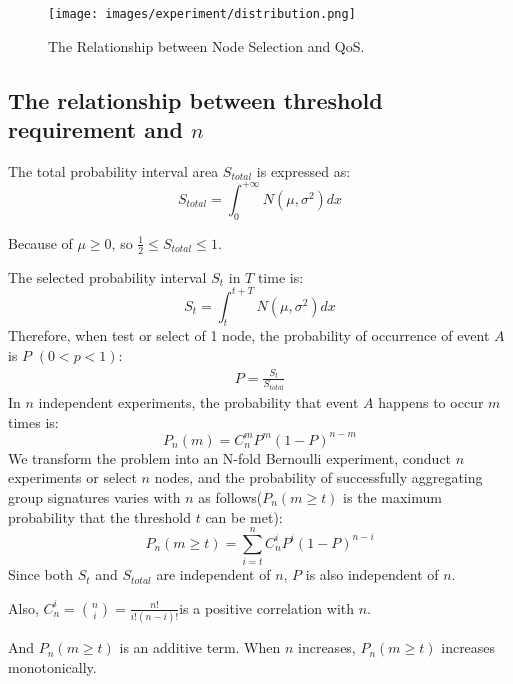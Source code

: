 \documentclass[paper]{ieice}
\begin{document}
    \begin{figure}[h!]
        \centering
        \texttt{[image: images/experiment/distribution.png]}
        \caption{The Relationship between Node Selection and QoS.}
        \label{fig:distribution}
    \end{figure}

    \subsection{The relationship between threshold requirement and $n$}
      The total probability interval area $S_{total}$ is expressed as:
          \begin{equation}
        S_{total} = \int_{0}^{+\infty}N(\mu,\sigma^2)dx
    \end{equation}
    
    Because of $\mu \ge 0$, so $\frac{1}{2} \leq S_{total} \leq 1$.
    
    The selected probability interval $S_{t}$ in $T$ time is:
    \begin{equation}
        S_{t} = \int_{t}^{t+T}N(\mu,\sigma^2)dx
    \end{equation}
    Therefore, when test or select of 1 node, the probability of occurrence of event $A$ is $P$ $(0<p<1)$:
      \begin{gather}
         P = \frac{S_{t}}{S_{total}}
    \end{gather}
    In $n$ independent experiments, the probability that event $A$ happens to occur $m$ times is:
    \begin{equation}
        P_n(m) = C_n^m P^m(1-P)^{n-m}
    \end{equation}
    We transform the problem into an N-fold Bernoulli experiment, conduct $n$ experiments or select $n$ nodes, and the probability of successfully aggregating group signatures varies with $n$ as follows($P_n(m \ge t)$ is the maximum probability that the threshold $t$ can be met):
    \begin{equation}
        P_n(m \ge t) = \sum_{i=t}^{n} C_n^i P^i(1-P)^{n-i}
    \end{equation}
    Since both $S_t$ and $S_{total}$ are independent of $n$, $P$ is also independent of $n$.
    
    Also, $C_n^i = \binom{n}{i} = \frac{n!}{i!(n-i)!} $is a positive correlation with $n$.
    
    And $P_n(m\geq t)$ is an additive term. When $n$ increases, $P_n(m\geq t)$ increases monotonically.
    
\end{document}
